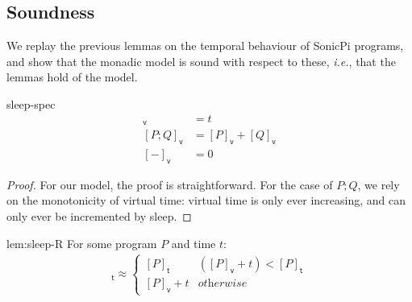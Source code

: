 \documentclass[preprint]{sigplanconf}
\newcommand{\note}[1]{{\color{blue}{#1}}}
\theoremstyle{definition}
\newcommand{\sleep}{\mathsf{sleep}\;}
\newcommand{\lang}{SonicPi}
\newcommand{\vtime}[1]{[#1]_{\mathsf{v}}}
\newcommand{\etime}[1]{[#1]_{\mathsf{t}}}
\newcommand{\ie}{\emph{i.e.}}
\begin{document}
\subsection{Soundness}

We replay the previous lemmas on the temporal behaviour of \lang{} programs,
and show that the monadic model is sound with respect to these, \ie{},
that the lemmas hold of the model. 

\noindent
\begin{repdefinition}{sleep-spec}
\begin{align*}
\vtime{\sleep t} & = t \\ 
\vtime{P; Q} & = \vtime{P} + \vtime{Q} \\
\vtime{-} & = 0
\end{align*}
\end{repdefinition}

\begin{proof}
For our model, the proof is straightforward. For the case of
$P; Q$, we rely on the monotonicity of virtual time: virtual
time is only ever increasing, and can only ever be incremented by sleep. 
\note{Could put more here}
\end{proof}

\begin{replemma}{lem:sleep-R}
For some program $P$ and time $t$: 
\begin{align*}
\etime{P; \sleep{} t} \approx
 \begin{cases}
   \etime{P} & (\vtime{P} + t) < \etime{P} \\
   \vtime{P} + t  & \textit{otherwise}
 \end{cases}
\end{align*}
\end{replemma}
\end{document}
